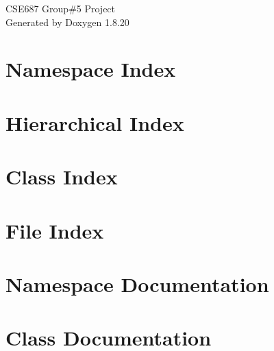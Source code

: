 \let\mypdfximage\pdfximage\def\pdfximage{\immediate\mypdfximage}\documentclass[twoside]{book}
\newcommand{\+}{\discretionary{\mbox{\scriptsize$\hookleftarrow$}}{}{}}
\newcommand{\clearemptydoublepage}{%
  \newpage{\pagestyle{empty}\cleardoublepage}%
}
\begin{document}
\hypersetup{pageanchor=false,
             bookmarksnumbered=true,
             pdfencoding=unicode
            }
\begin{titlepage}
\vspace*{7cm}
\begin{center}%
{\Large C\+S\+E687 Group\#5 Project }\\
\vspace*{1cm}
{\large Generated by Doxygen 1.8.20}\\
\end{center}
\end{titlepage}
\clearemptydoublepage
{}
\tableofcontents
\clearemptydoublepage
{}
\hypersetup{pageanchor=true}

\chapter{Namespace Index}

\chapter{Hierarchical Index}

\chapter{Class Index}

\chapter{File Index}

\chapter{Namespace Documentation}






\chapter{Class Documentation}



























\end{document}

